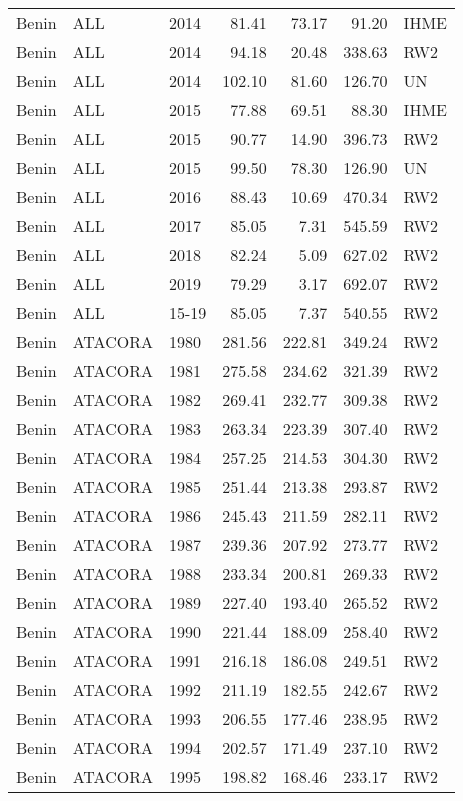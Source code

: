 \begin{longtable}{lllrrrl}
  Benin & ALL & 2014 & 81.41 & 73.17 & 91.20 & IHME \\ 
  Benin & ALL & 2014 & 94.18 & 20.48 & 338.63 & RW2 \\ 
  Benin & ALL & 2014 & 102.10 & 81.60 & 126.70 & UN \\ 
  Benin & ALL & 2015 & 77.88 & 69.51 & 88.30 & IHME \\ 
  Benin & ALL & 2015 & 90.77 & 14.90 & 396.73 & RW2 \\ 
  Benin & ALL & 2015 & 99.50 & 78.30 & 126.90 & UN \\ 
  Benin & ALL & 2016 & 88.43 & 10.69 & 470.34 & RW2 \\ 
  Benin & ALL & 2017 & 85.05 & 7.31 & 545.59 & RW2 \\ 
  Benin & ALL & 2018 & 82.24 & 5.09 & 627.02 & RW2 \\ 
  Benin & ALL & 2019 & 79.29 & 3.17 & 692.07 & RW2 \\ 
  Benin & ALL & 15-19 & 85.05 & 7.37 & 540.55 & RW2 \\ 
  Benin & ATACORA & 1980 & 281.56 & 222.81 & 349.24 & RW2 \\ 
  Benin & ATACORA & 1981 & 275.58 & 234.62 & 321.39 & RW2 \\ 
  Benin & ATACORA & 1982 & 269.41 & 232.77 & 309.38 & RW2 \\ 
  Benin & ATACORA & 1983 & 263.34 & 223.39 & 307.40 & RW2 \\ 
  Benin & ATACORA & 1984 & 257.25 & 214.53 & 304.30 & RW2 \\ 
  Benin & ATACORA & 1985 & 251.44 & 213.38 & 293.87 & RW2 \\ 
  Benin & ATACORA & 1986 & 245.43 & 211.59 & 282.11 & RW2 \\ 
  Benin & ATACORA & 1987 & 239.36 & 207.92 & 273.77 & RW2 \\ 
  Benin & ATACORA & 1988 & 233.34 & 200.81 & 269.33 & RW2 \\ 
  Benin & ATACORA & 1989 & 227.40 & 193.40 & 265.52 & RW2 \\ 
  Benin & ATACORA & 1990 & 221.44 & 188.09 & 258.40 & RW2 \\ 
  Benin & ATACORA & 1991 & 216.18 & 186.08 & 249.51 & RW2 \\ 
  Benin & ATACORA & 1992 & 211.19 & 182.55 & 242.67 & RW2 \\ 
  Benin & ATACORA & 1993 & 206.55 & 177.46 & 238.95 & RW2 \\ 
  Benin & ATACORA & 1994 & 202.57 & 171.49 & 237.10 & RW2 \\ 
  Benin & ATACORA & 1995 & 198.82 & 168.46 & 233.17 & RW2 \\ 

\end{longtable}
